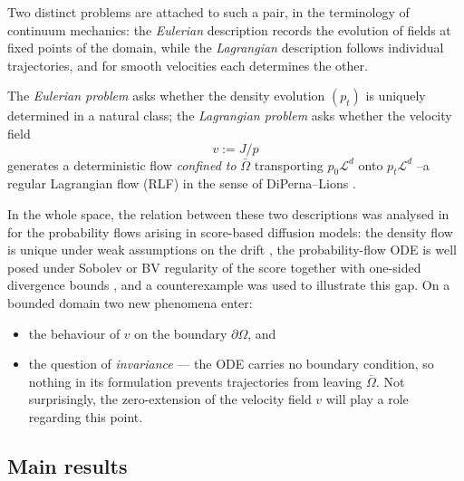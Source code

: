 \documentclass[11pt]{amsart}
\theoremstyle{definition}
\newcommand{\Ld}{\mathcal{L}^d}
\begin{document}
Two distinct problems are attached to such a pair, in the
terminology of continuum mechanics: the \emph{Eulerian} description
records the evolution of fields at fixed points of the domain, while the
\emph{Lagrangian} description follows individual trajectories, and
for smooth velocities each determines the other. 

The
\emph{Eulerian problem} asks whether the density evolution $(p_t)$
is uniquely determined in a natural class; the \emph{Lagrangian
problem} asks whether the velocity field
\[
v := J/p
\]
generates a deterministic flow \emph{confined to} $\bar\Omega$ 
transporting $p_0\Ld$ onto $p_t\Ld$ --a regular Lagrangian flow
(RLF) in the sense of DiPerna--Lions \cite{DiPernaLions}. 

In the whole space, the
relation between these two descriptions was analysed in \cite{pfode}
for the probability flows arising in score-based diffusion models:
the density flow is unique under weak assumptions on the drift
\cite[Theorem~3.1]{pfode}, the probability-flow ODE is well posed
under Sobolev or BV regularity of the score together with one-sided
divergence bounds \cite[Theorem~4.5]{pfode}, and a counterexample was used to
illustrate this gap. On a bounded domain two new
phenomena enter:\begin{itemize}
    \item the behaviour of $v$ on the boundary $\partial\Omega$, and 
    \item the
question of \emph{invariance} --- the ODE carries no boundary
condition, so nothing in its formulation prevents trajectories from
leaving $\bar\Omega$. Not surprisingly, the zero-extension of the velocity field $v$ will play a role regarding this point.
\end{itemize} 

\subsection{Main results}
\end{document}
